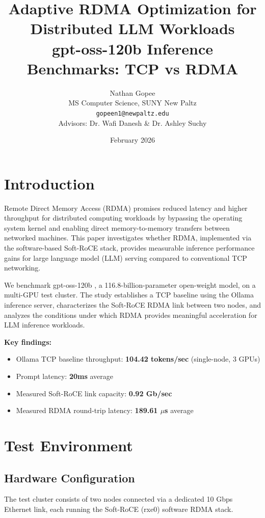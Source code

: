 \documentclass[10pt,letterpaper]{article}
\title{\textbf{Adaptive RDMA Optimization for Distributed LLM Workloads}\\[0.5em]
\large gpt-oss-120b Inference Benchmarks: TCP vs RDMA}
\author{Nathan Gopee\\
MS Computer Science, SUNY New Paltz\\
\texttt{gopeen1@newpaltz.edu}\\[1em]
\small Advisors: Dr. Wafi Danesh \& Dr. Ashley Suchy}
\date{February 2026}
\begin{document}
\maketitle

\section{Introduction}

Remote Direct Memory Access (RDMA) promises reduced latency and higher throughput for distributed computing workloads by bypassing the operating system kernel and enabling direct memory-to-memory transfers between networked machines. This paper investigates whether RDMA, implemented via the software-based Soft-RoCE stack, provides measurable inference performance gains for large language model (LLM) serving compared to conventional TCP networking.

We benchmark gpt-oss-120b \cite{gptoss-hf}, a 116.8-billion-parameter open-weight model, on a multi-GPU test cluster. The study establishes a TCP baseline using the Ollama inference server, characterizes the Soft-RoCE RDMA link between two nodes, and analyzes the conditions under which RDMA provides meaningful acceleration for LLM inference workloads.

\textbf{Key findings:}
\begin{itemize}[noitemsep]
    \item Ollama TCP baseline throughput: \textbf{104.42 tokens/sec} (single-node, 3 GPUs)
    \item Prompt latency: \textbf{20ms} average
    \item Measured Soft-RoCE link capacity: \textbf{0.92 Gb/sec}
    \item Measured RDMA round-trip latency: \textbf{189.61 $\mu$s} average
\end{itemize}

\section{Test Environment}

\subsection{Hardware Configuration}

The test cluster consists of two nodes connected via a dedicated 10 Gbps Ethernet link, each running the Soft-RoCE (rxe0) software RDMA stack.
\end{document}
